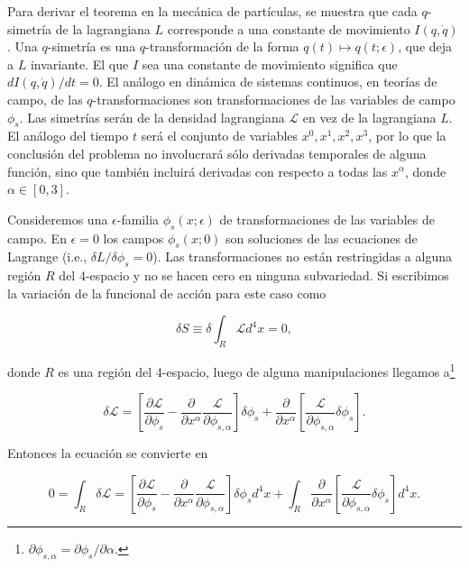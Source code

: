 \documentclass[a4paper,10pt]{article}
\numberwithin{equation}{section}
\begin{document}
\vspace{.3cm}

Para derivar el teorema en la mecánica de partículas, se muestra que cada $q$-simetría 
de la lagrangiana $L$ corresponde a una constante de movimiento $I(q,\dot{q})$. Una 
$q$-simetría es una $q$-transformación de la forma $q(t) \mapsto q(t;\epsilon)$, que 
deja a $L$ invariante. El que $I$ sea una constante de movimiento significa que 
$dI(q,\dot{q})/dt = 0$. El análogo en dinámica de sistemas continuos, en teorías 
de campo, de las $q$-transformaciones son transformaciones de las variables de 
campo $\phi_s$. Las simetrías serán de la densidad lagrangiana $\mathcal{L}$ en vez 
de la lagrangiana $L$. El análogo del tiempo $t$ será el conjunto de variables 
$x^0, x^1, x^2, x^3$, por lo que la conclusión del problema no involucrará sólo 
derivadas temporales de alguna función, sino que también incluirá derivadas con 
respecto a todas las $x^\alpha$, donde $\alpha \in [0,3]$. 

\vspace{.3cm}

Consideremos una $\epsilon$-familia $\phi_s(x;\epsilon)$ de transformaciones de las 
variables de campo. En $\epsilon = 0$ los campos $\phi_s(x;0)$ son soluciones de 
las ecuaciones de Lagrange (i.e., $\delta L / \delta \phi_s = 0$). Las transformaciones 
no están restringidas a alguna región $R$ del 4-espacio y no se hacen cero en 
ninguna subvariedad. Si escribimos la variación de la funcional de acción para este 
caso como

\begin{equation}
 \delta S \equiv \delta \int_R \mathcal{L} d^4 x = 0,
 \label{eq:noet1}
\end{equation}

donde $R$ es una región del 4-espacio, luego de alguna manipulaciones llegamos a\footnote{ 
$\partial \phi_{s,\alpha} = \partial \phi_s / \partial \alpha$.} 

\begin{equation}
 \delta \mathcal{L} = \left[ \frac{\partial \mathcal{L}}{\partial \phi_s} 
 - \frac{\partial}{\partial x^\alpha}\frac{\mathcal{L}}{\partial \phi_{s,\alpha}} \right] 
 \delta \phi_s + \frac{\partial}{\partial x^\alpha}\left[\frac{\mathcal{L}}{\partial \phi_{s,\alpha}} 
 \delta \phi_s \right].
 \label{eq:noet2}
\end{equation}

Entonces la ecuación  se convierte en 

\begin{equation}
 0 = \int_R \delta \mathcal{L} = \left[ \frac{\partial \mathcal{L}}{\partial \phi_s} 
 - \frac{\partial}{\partial x^\alpha}\frac{\mathcal{L}}{\partial \phi_{s,\alpha}} \right] 
 \delta \phi_s d^4 x + \int_R \frac{\partial}{\partial x^\alpha}\left[\frac{\mathcal{L}}{\partial \phi_{s,\alpha}} 
 \delta \phi_s \right]d^4 x.
 \label{eq:noet3}
\end{equation}
\end{document}
